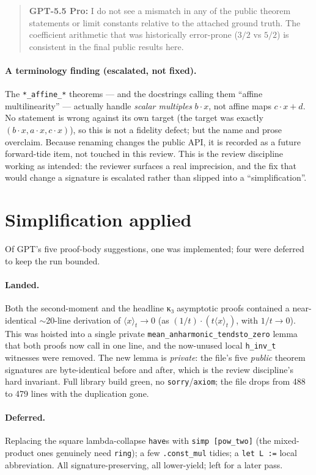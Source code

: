 \documentclass[11pt]{article}
\newcommand{\gptbox}[1]{\par\medskip\begin{quote}\small\textbf{\textcolor{green!50!black}{GPT-5.5 Pro:}} #1\end{quote}\medskip}
\begin{document}
\gptbox{I do not see a mismatch in any of the public theorem statements or limit
constants relative to the attached ground truth. The coefficient arithmetic that
was historically error-prone ($3/2$ vs $5/2$) is consistent in the final public
results here.}

\paragraph{A terminology finding (escalated, not fixed).} The
\texttt{*\_affine\_*} theorems --- and the docstrings calling them ``affine
multilinearity'' --- actually handle \emph{scalar multiples} $b\cdot x$, not affine
maps $c\cdot x+d$. No statement is wrong against its own target (the target was
exactly $(b\cdot x,a\cdot x,c\cdot x)$), so this is not a fidelity defect; but the
name and prose overclaim. Because renaming changes the public API, it is recorded as
a future forward-tide item, not touched in this review. This is the review
discipline working as intended: the reviewer surfaces a real imprecision, and the
fix that would change a signature is escalated rather than slipped into a
``simplification''.

\section{Simplification applied}

Of GPT's five proof-body suggestions, one was implemented; four were deferred to
keep the run bounded.

\paragraph{Landed.} Both the second-moment and the headline κ₃ asymptotic proofs
contained a near-identical
$\sim$20-line derivation of $\langle x\rangle_t\to0$ (as
$(1/t)\cdot(t\langle x\rangle_t)$, with $1/t\to0$). This was hoisted into a single
private \texttt{mean\_anharmonic\_tendsto\_zero} lemma that both proofs now call in
one line, and the now-unused local \texttt{h\_inv\_t} witnesses were removed. The
new lemma is \emph{private}: the file's five \emph{public} theorem signatures are
byte-identical before and after, which is the review discipline's hard invariant.
Full library build green, no \texttt{sorry}/\texttt{axiom}; the file drops from 488
to 479 lines with the duplication gone.

\paragraph{Deferred.} Replacing the square lambda-collapse \texttt{have}s with
\texttt{simp [pow\_two]} (the mixed-product ones genuinely need \texttt{ring}); a few
\texttt{.const\_mul} tidies; a \texttt{let L :=} local abbreviation. All
signature-preserving, all lower-yield; left for a later pass.
\end{document}
